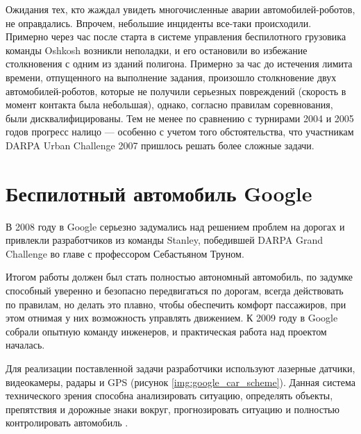 Ожидания тех, кто жаждал увидеть многочисленные аварии автомобилей-роботов, 
не оправдались. Впрочем, небольшие инциденты все-таки происходили. Примерно 
через час после старта в системе управления беспилотного грузовика команды 
Oshkosh возникли неполадки, и его остановили во избежание столкновения с 
одним из зданий полигона. Примерно за час до истечения лимита времени, 
отпущенного на выполнение задания, произошло столкновение двух 
автомобилей-роботов, которые не получили серьезных повреждений 
(скорость в момент контакта была небольшая), однако, согласно правилам 
соревнования, были дисквалифицированы. Тем не менее по сравнению с турнирами 
2004 и 2005 годов прогресс налицо — особенно с учетом того обстоятельства, что 
участникам DARPA Urban Challenge 2007 пришлось решать более сложные задачи.





\section{Беспилотный автомобиль Google} \label{sect_Google}

В 2008 году в Google серьезно задумались над решением проблем на дорогах и привлекли 
разработчиков из команды Stanley, победившей DARPA Grand Challenge во главе с 
профессором Себастьяном Труном.

Итогом работы должен был стать полностью автономный 
автомобиль, по задумке способный уверенно и безопасно передвигаться по дорогам, 
всегда действовать по правилам, но делать это плавно, чтобы обеспечить комфорт 
пассажиров, при этом отнимая у них возможность управлять движением. К 2009 году 
в Google собрали опытную команду инженеров, и практическая работа над проектом 
началась. 

Для реализации поставленной задачи разработчики используют лазерные датчики, 
видеокамеры, радары и GPS (рисунок \ref{img:google_car_scheme}). 
Данная система технического зрения способна анализировать ситуацию, 
определять объекты, препятствия и дорожные знаки вокруг, прогнозировать 
ситуацию и полностью контролировать автомобиль \cite{MADI_GAZ}.

